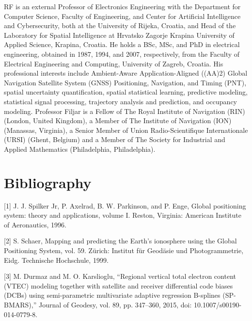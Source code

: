 \let\LaTeXcline\cline\documentclass[sn-mathphys-num]{sn-jnl}\let\cline\LaTeXcline
\begin{document}
RF is an external Professor of Electronics Engineering with the Department for Computer Science, Faculty of Engineering, and Center for Artificial Intelligence and Cybersecurity, both at the University of Rijeka, Croatia, and Head of the Laboratory for Spatial Intelligence at Hrvatsko Zagorje Krapina University of Applied Science, Krapina, Croatia. He holds a BSc, MSc, and PhD in electrical engineering, obtained in 1987, 1994, and 2007, respectively, from the Faculty of Electrical Engineering and Computing, University of Zagreb, Croatia. His professional interests include Ambient-Aware Application-Aligned ((AA)2) Global Navigation Satellite System (GNSS) Positioning, Navigation, and Timing (PNT), spatial uncertainty quantification, spatial statistical learning, predictive modeling, statistical signal processing, trajectory analysis and prediction, and occupancy modeling. Professor Filjar is a Fellow of The Royal Institute of Navigation (RIN) (London, United Kingdom), a Member of The Institute of Navigation (ION) (Manassas, Virginia), a Senior Member of Union Radio-Scientifique Internationale (URSI) (Ghent, Belgium) and a Member of The Society for Industrial and Applied Mathematics  (Philadelphia, Philadelphia).


\section{Bibliography}
[1] J. J. Spilker Jr, P. Axelrad, B. W. Parkinson, and P. Enge, Global positioning system: theory and applications, volume I. Reston, Virginia: American Institute of Aeronautics, 1996.

[2] S. Schaer, Mapping and predicting the Earth’s ionosphere using the Global Positioning System, vol. 59. Zürich: Institut für Geodäsie und Photogrammetrie, Eidg. Technische Hochschule, 1999.

[3] M. Durmaz and M. O. Karslioglu, “Regional vertical total electron content (VTEC) modeling together with satellite and receiver differential code biases (DCBs) using semi-parametric multivariate adaptive regression B-splines (SP-BMARS),” Journal of Geodesy, vol. 89, pp. 347–360, 2015, doi: 10.1007/s00190-014-0779-8.
\end{document}

